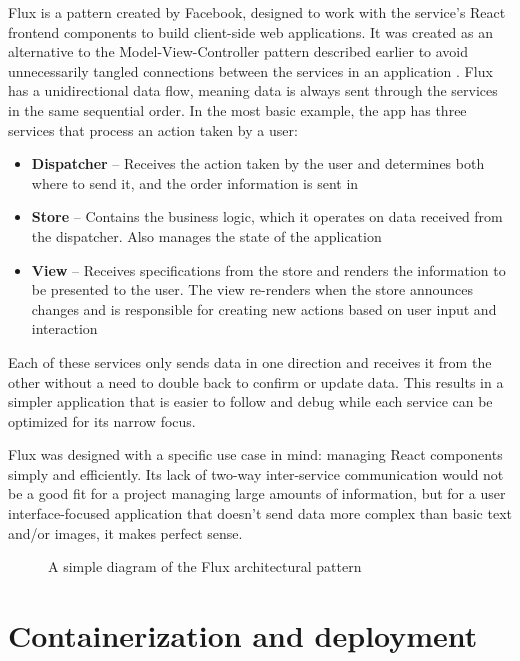 Flux is a pattern created by Facebook, designed to work with the service's React frontend components to build client-side web applications. It was created as an alternative to the Model-View-Controller pattern described earlier to avoid unnecessarily tangled connections between the services in an application \cite{tay_depth_2020}. Flux has a unidirectional data flow, meaning data is always sent through the services in the same sequential order. In the most basic example, the app has three services that process an action taken by a user:
\begin{itemize}
	\item \textbf{Dispatcher} -- Receives the action taken by the user and determines both where to send it, and the order information is sent in
	\item \textbf{Store} -- Contains the business logic, which it operates on data received from the dispatcher. Also manages the state of the application
	\item \textbf{View} -- Receives specifications from the store and renders the information to be presented to the user. The view re-renders when the store announces changes and is responsible for creating new actions based on user input and interaction
\end{itemize}
Each of these services only sends data in one direction and receives it from the other without a need to double back to confirm or update data. This results in a simpler application that is easier to follow and debug while each service can be optimized for its narrow focus.

Flux was designed with a specific use case in mind: managing React components simply and efficiently. Its lack of two-way inter-service communication would not be a good fit for a project managing large amounts of information, but for a user interface-focused application that doesn't send data more complex than basic text and/or images, it makes perfect sense.

\begin{figure}[!ht]
	\begin{center}
		\caption{A simple diagram of the Flux architectural pattern}\label{flux}
	\end{center}
\end{figure}


\section{Containerization and deployment}


